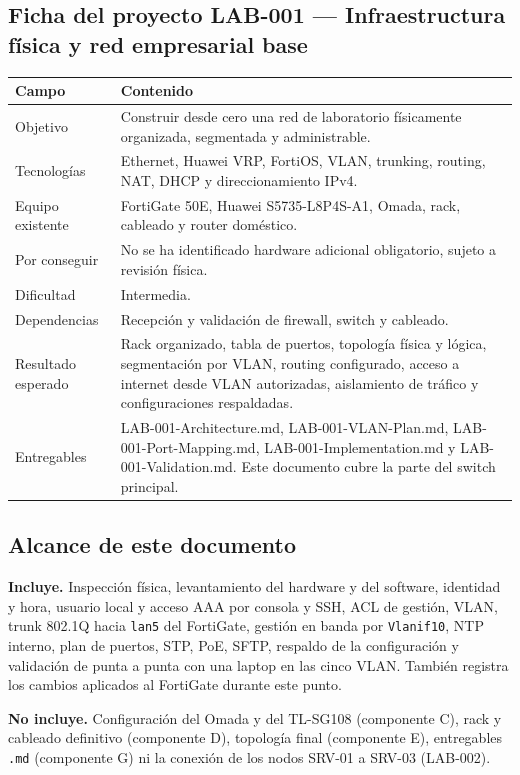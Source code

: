 \documentclass[11pt,a4paper]{article}
\newcommand{\cab}{\rowcolor{light}}
\begin{document}
\subsection*{Ficha del proyecto LAB-001 --- Infraestructura física y red empresarial base}
\begin{tabularx}{\textwidth}{L{3.6cm} Z}
  \toprule
  \cab\textbf{Campo} & \textbf{Contenido}\\
  \midrule
  Objetivo & Construir desde cero una red de laboratorio físicamente organizada, segmentada y administrable.\\
  Tecnologías & Ethernet, Huawei VRP, FortiOS, VLAN, trunking, routing, NAT, DHCP y direccionamiento IPv4.\\
  Equipo existente & FortiGate 50E, Huawei S5735-L8P4S-A1, Omada, rack, cableado y router doméstico.\\
  Por conseguir & No se ha identificado hardware adicional obligatorio, sujeto a revisión física.\\
  Dificultad & Intermedia.\\
  Dependencias & Recepción y validación de firewall, switch y cableado.\\
  Resultado esperado & Rack organizado, tabla de puertos, topología física y lógica, segmentación por VLAN, routing configurado, acceso a internet desde VLAN autorizadas, aislamiento de tráfico y configuraciones respaldadas.\\
  Entregables & LAB-001-Architecture.md, LAB-001-VLAN-Plan.md, LAB-001-Port-Mapping.md, LAB-001-Implementation.md y LAB-001-Validation.md. Este documento cubre la parte del switch principal.\\
  \bottomrule
\end{tabularx}

\subsection{Alcance de este documento}
\textbf{Incluye.} Inspección física, levantamiento del hardware y del software, identidad y hora, usuario local y acceso AAA por consola y SSH, ACL de gestión, VLAN, trunk 802.1Q hacia \texttt{lan5} del FortiGate, gestión en banda por \texttt{Vlanif10}, NTP interno, plan de puertos, STP, PoE, SFTP, respaldo de la configuración y validación de punta a punta con una laptop en las cinco VLAN. También registra los cambios aplicados al FortiGate durante este punto.

\textbf{No incluye.} Configuración del Omada y del TL-SG108 (componente C), rack y cableado definitivo (componente D), topología final (componente E), entregables \texttt{.md} (componente G) ni la conexión de los nodos SRV-01 a SRV-03 (LAB-002).
\end{document}
